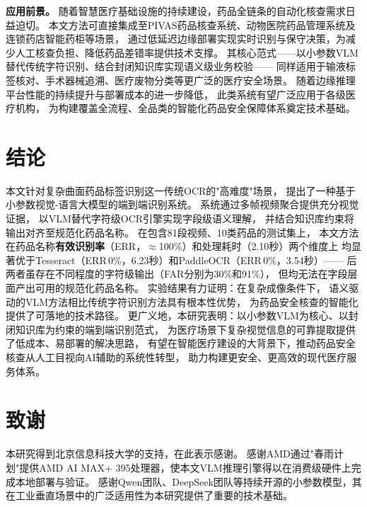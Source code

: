 \documentclass[12pt, a4paper]{article}
\begin{document}
\noindent\textbf{应用前景。}
随着智慧医疗基础设施的持续建设，药品全链条的自动化核查需求日益迫切。
本文方法可直接集成至PIVAS药品核查系统、动物医院药品管理系统及连锁药店智能药柜等场景，
通过低延迟边缘部署实现实时识别与保守决策，为减少人工核查负担、降低药品差错率提供技术支撑。
其核心范式——以小参数VLM替代传统字符识别、结合封闭知识库实现语义级业务校验——
同样适用于输液标签核对、手术器械追溯、医疗废物分类等更广泛的医疗安全场景。
随着边缘推理平台性能的持续提升与部署成本的进一步降低，
此类系统有望广泛应用于各级医疗机构，
为构建覆盖全流程、全品类的智能化药品安全保障体系奠定技术基础。


\section{结论}
\label{sec:conclusion}

本文针对复杂曲面药品标签识别这一传统OCR的"高难度"场景，
提出了一种基于小参数视觉-语言大模型的端到端识别系统。
系统通过多帧视频聚合提供充分视觉证据，
以VLM替代字符级OCR引擎实现字段级语义理解，
并结合知识库约束将输出对齐至规范化药品名称。
在包含81段视频、10类药品的测试集上，
本文方法在药品名称\textbf{有效识别率}（ERR，$\approx$100\%）和处理耗时（2.10秒）两个维度上
均显著优于Tesseract（ERR\,0\%，6.23秒）和PaddleOCR（ERR\,0\%，3.54秒）——
后两者虽存在不同程度的字符级输出（FAR分别为30\%和91\%），
但均无法在字段层面产出可用的规范化药品名称。
实验结果有力证明：在复杂成像条件下，
语义驱动的VLM方法相比传统字符识别方法具有根本性优势，
为药品安全核查的智能化提供了可落地的技术路径。
更广义地，本研究表明：以小参数VLM为核心、以封闭知识库为约束的端到端识别范式，
为医疗场景下复杂视觉信息的可靠提取提供了低成本、易部署的解决思路，
有望在智能医疗建设的大背景下，推动药品安全核查从人工目视向AI辅助的系统性转型，
助力构建更安全、更高效的现代医疗服务体系。

\section*{致谢}
本研究得到北京信息科技大学的支持，在此表示感谢。
感谢AMD通过"春雨计划"提供AMD AI MAX+ 395处理器，使本文VLM推理引擎得以在消费级硬件上完成本地部署与验证。
感谢Qwen团队、DeepSeek团队等持续开源的小参数模型，其在工业垂直场景中的广泛适用性为本研究提供了重要的技术基础。
\end{document}
